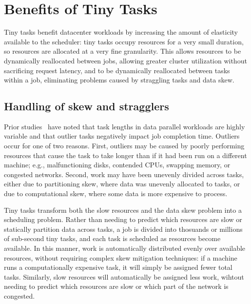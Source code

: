 \section{Benefits of Tiny Tasks}
\label{sec:benefits}

Tiny tasks benefit datacenter workloads by increasing the amount of elasticity
available to the scheduler: tiny tasks occupy resources for a very small
duration, so resources are allocated at a very fine granularity. This 
allows resources to be dynamically reallocated between jobs, allowing greater
cluster utilization without sacrificing request latency, and to be dynamically
reallocated between tasks within a job, eliminating problems caused
by straggling tasks and data skew.

\subsection{Handling of skew and stragglers}
Prior studies~\cite{ananthanarayanan2010reining,zaharia2008improving} have noted that
task lengths in data parallel workloads are highly variable and that outlier
tasks negatively impact job completion time.
Outliers occur for one of two reasons. 
First, outliers may be caused by poorly performing resources that cause the
task to take longer than if it had been run on a different machine; e.g.,
malfunctioning disks, contended CPUs, swapping memory, or congested networks.
Second, work may have been unevenly
divided across tasks, either due to
partitioning skew, where data was unevenly allocated to tasks, or due to
computational skew, where some data is more expensive to process.

Tiny tasks transform both the slow resources and the data skew problem
into a scheduling problem.  Rather than needing to predict which resources
are slow or statically partition data across tasks, a job is divided into
thosuands or millions of sub-second tiny tasks, and each task is scheduled
as resources become available.  In this manner, work is automatically
distributed evenly over available resources, without requiring complex skew
mitigation techniques: if a machine runs a computationally expensive task, it
will simply be assigned fewer total tasks.  Similarly, slow resources will
automatically be assigned less work, wihtout needing to predict which
resources are slow or which part of the network is congested.

